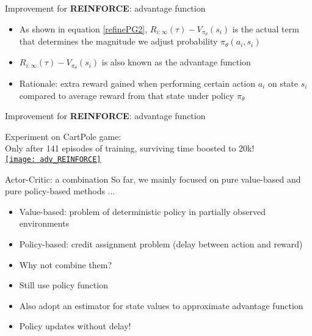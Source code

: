 \begin{frame}{Improvement for \textbf{REINFORCE}: advantage function}
    \begin{itemize}
    \item As shown in equation \ref{refinePG2}, $R_{i:\infty}(\tau)-V_{\pi_\theta}(s_i)$ is the actual term that determines the magnitude we adjust probability $\pi_{\theta}(a_i,s_i)$\vspace{0.3cm}
    \item $R_{i:\infty}(\tau)-V_{\pi_\theta}(s_i)$ is also known as the advantage function \vspace{0.3cm}
    \item Rationale: extra reward gained when performing certain action $a_i$ on state $s_i$ compared to average reward from that state under policy $\pi_{\theta}$\vspace{0.3cm}
    \end{itemize}
\end{frame}

\begin{frame}{Improvement for \textbf{REINFORCE}: advantage function}
    \vspace{0.2cm}
    \begin{center}Experiment on CartPole game:\\Only after 141 episodes of training, surviving time boosted to 20k! \\\href{https://youtu.be/6EdXsW5A1iU}{\texttt{[image: adv\_REINFORCE]}}\end{center}
\end{frame}

\begin{frame}{Actor-Critic: a combination}
    So far, we mainly focused on pure value-based and pure policy-based methods ... \vspace{0.3cm}
    \begin{itemize}
        \item Value-based: problem of deterministic policy in partially observed environments\vspace{0.3cm}
        \item Policy-based: credit assignment problem (delay between action and reward)\vspace{0.3cm}
        \item Why not combine them?\vspace{0.3cm}
        \item Still use policy function\vspace{0.3cm}
        \item Also adopt an estimator for state values to approximate advantage function\vspace{0.3cm}
        \item Policy updates without delay!
    \end{itemize}
\end{frame}

